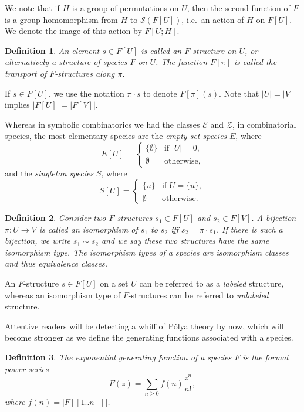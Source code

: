 \documentclass[12pt]{article}
\theoremstyle{plain}
\newtheorem{defin}{Definition}
\begin{document}
We note that if \( H \) is a group of permutations on \( U \), then the second function of \( F \) is a group homomorphism from \( H \) to \(\mathcal{S}(F[U]) \), i.e.\ an action of \( H \) on \(F[U]\).
We denote the image of this action by \( F[U; H] \).

\begin{defin}
An element \( s \in F[U] \) is called an \(F\)-\emph{structure} on \(U\), or alternatively a \emph{structure of species \(F\) on \(U\)}.
The function \( F[\pi] \) is called the \emph{transport} of \(F\)-structures along \( \pi \).
\end{defin}

If \( s \in F[U] \), we use the notation \( \pi \cdot s \) to denote \( F[\pi](s) \).
Note that \( |U| = |V| \) implies \( |F[U]| = |F[V]| \).

Whereas in symbolic combinatorics we had the classes \(\mathcal{E}\) and \(\mathcal{Z}\), in combinatorial species, the most elementary species are the \emph{empty set species} \(E\), where
\[ E[U] = \begin {cases}
\{\emptyset\}  & \text{if } |U|=0, \\
\emptyset & \text{otherwise},
\end {cases}
\]
and the \emph{singleton species} \(S\), where
\[ S[U] = \begin {cases}
\{u\}  & \text{if } U=\{u\}, \\
\emptyset & \text{otherwise}.
\end {cases}
\]

\begin{defin}
Consider two \(F\)-structures \(s_1 \in F[U]\) and \( s_2 \in F[V] \).
A bijection \( \pi: U \rightarrow V \) is called an \emph{isomorphism} of \(s_1\) to \(s_2\) iff \(s_2 = \pi \cdot s_1 \).
If there is such a bijection, we write \(s_1 \sim s_2 \) and we say these two structures have the same \emph{isomorphism type}.
The isomorphism types of a species are isomorphism classes and thus equivalence classes.
\end{defin}

An \(F\)-structure \(s \in F[U] \) on a set \( U \) can be referred to as a \emph{labeled} structure, whereas an isomorphism type of \( F \)-structures can be referred to \emph{unlabeled} structure.

Attentive readers will be detecting a whiff of P\'olya theory by now, which will become stronger as we define the generating functions associated with a species.

\begin{defin}
The \emph{exponential generating function} of a species \( F \) is the formal power series
\[ F(z) = \sum_{n \geq 0} f(n) \frac{z^n}{n!}, \]
where \( f(n) = |F[[1..n]]| \).
\end{defin}
\end{document}
